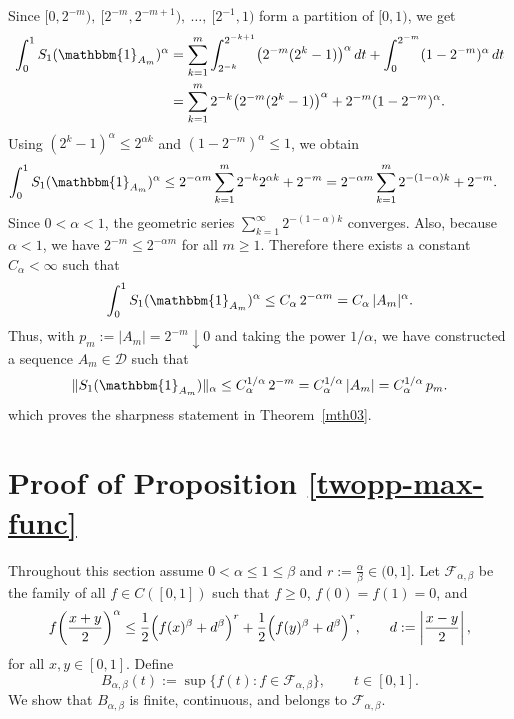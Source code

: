 \documentclass[11pt]{amsart}
\theoremstyle{definition}
\renewcommand{\1}{{\mathbbm{1}}}
\begin{document}
Since
$
[0,2^{-m}),\ [2^{-m},2^{-m+1}),\ \dots,\ {[2^{-1},1)}
$
form a partition of {$[0,1)$}, we get
\begin{align*}
\int_0^1 S_1(\mathbbm{1}_{A_m})^\alpha
&=
\sum_{k=1}^m
\int_{2^{-k}}^{2^{-k+1}}
\bigl(2^{-m}(2^k-1)\bigr)^\alpha\,dt
+
\int_0^{2^{-m}} (1-2^{-m})^\alpha\,dt \\
&=
\sum_{k=1}^m
2^{-k}\bigl(2^{-m}(2^k-1)\bigr)^\alpha
+
2^{-m}(1-2^{-m})^\alpha.
\end{align*}
Using $(2^k-1)^\alpha\le 2^{\alpha k}$ and $(1-2^{-m})^\alpha\le 1$, we obtain
\begin{align*}
\int_0^1 S_1(\mathbbm{1}_{A_m})^\alpha
&\le
2^{-\alpha m}\sum_{k=1}^m 2^{-k}2^{\alpha k}
+
2^{-m} =
2^{-\alpha m}\sum_{k=1}^m 2^{-(1-\alpha)k}
+
2^{-m}.
\end{align*}
Since $0<\alpha<1$, the geometric series
$
\sum_{k=1}^\infty 2^{-(1-\alpha)k}
$
converges. Also, because $\alpha<1$, we have $2^{-m}\le 2^{-\alpha m}$ for all
$m\ge1$. Therefore there exists a constant $C_\alpha<\infty$ such that
\[
\int_0^1 S_1(\mathbbm{1}_{A_m})^\alpha
\le
C_\alpha\,2^{-\alpha m}
=
C_\alpha\,|A_m|^\alpha.
\]
Thus, with $p_m:=|A_m|=2^{-m}\downarrow0$ and taking the power $1/\alpha$, we have constructed a sequence $A_m\in\mathcal D$ such that 
\[
\|S_1(\mathbbm{1}_{A_m})\|_\alpha
\le
C_\alpha^{1/\alpha}\,2^{-m}
=
C_\alpha^{1/\alpha}\,|A_m| = 
C_\alpha^{1/\alpha}\, p_m
.
\]
which proves the sharpness statement in Theorem~\ref{mth03}.
\qedhere













  

 











\section{Proof of Proposition \ref{twopp-max-func}}

Throughout this section assume
$
0<\alpha\le 1\le \beta$ and $
r:=\frac{\alpha}{\beta}\in(0,1].
$
Let $\mathcal F_{\alpha,\beta}$ be the family of all $f\in C([0,1])$ such that
$f\ge0$, $f(0)=f(1)=0$, and
\[
f\!\left(\frac{x+y}{2}\right)^\alpha
\le
\frac12\Bigl(f(x)^\beta+d^\beta\Bigr)^r
+
\frac12\Bigl(f(y)^\beta+d^\beta\Bigr)^r,
\qquad
d:=\left|\frac{x-y}{2}\right|,
\]
for all $x,y\in[0,1]$. Define
\[
B_{\alpha,\beta}(t):=\sup\{f(t):f\in\mathcal F_{\alpha,\beta}\},
\qquad t\in[0,1].
\]
We show that $B_{\alpha,\beta}$ is finite, continuous, and belongs to $\mathcal F_{\alpha,\beta}$.
\end{document}

